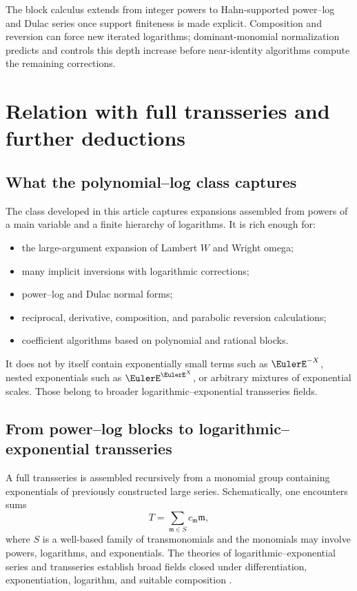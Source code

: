 \documentclass[11pt,openany]{book}
\theoremstyle{definition}
\theoremstyle{plain}
\theoremstyle{remark}
\newcommand{\m}{\mathfrak{m}}
\begin{document}
\begin{summarybox}
The block calculus extends from integer powers to Hahn-supported power--log and Dulac series once support finiteness is made explicit. Composition and reversion can force new iterated logarithms; dominant-monomial normalization predicts and controls this depth increase before near-identity algorithms compute the remaining corrections.
\end{summarybox}

\chapter{Relation with full transseries and further deductions}\label{ch:full-transseries}

\section{What the polynomial--log class captures}
The class developed in this article captures expansions assembled from powers of a main variable and a finite hierarchy of logarithms. It is rich enough for:
\begin{itemize}
\item the large-argument expansion of Lambert \(W\) and Wright omega;
\item many implicit inversions with logarithmic corrections;
\item power--log and Dulac normal forms;
\item reciprocal, derivative, composition, and parabolic reversion calculations;
\item coefficient algorithms based on polynomial and rational blocks.
\end{itemize}
It does not by itself contain exponentially small terms such as \(\EulerE^{-X}\), nested exponentials such as \(\EulerE^{\EulerE^X}\), or arbitrary mixtures of exponential scales. Those belong to broader logarithmic--exponential transseries fields.

\section{From power--log blocks to logarithmic--exponential transseries}
A full transseries is assembled recursively from a monomial group containing exponentials of previously constructed large series. Schematically, one encounters sums
\[
 T=\sum_{\m\in S}c_\m\m,
\]
where \(S\) is a well-based family of transmonomials and the monomials may involve powers, logarithms, and exponentials. The theories of logarithmic--exponential series and transseries establish broad fields closed under differentiation, exponentiation, logarithm, and suitable composition \cite{vdDMM-1997,vdDMM-2001,vdhoeven-book,adh-book}.
\end{document}
